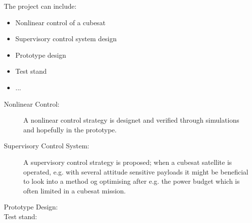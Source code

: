 The project can include:
\begin{itemize}\tightlist
  \item Nonlinear control of a cubesat
  \item Supervisory control system design
  \item Prototype design
  \item Test stand
  \item ...
\end{itemize}

\begin{description}
  \item[Nonlinear Control:] A nonlinear control strategy is designet and verified through simulations and hopefully in the prototype.
  \item[Supervisory Control System:] A supervisory control strategy is proposed; when a cubesat satellite is operated, e.g. with several attitude sensitive payloads it might be beneficial to look into a method og optimising after e.g. the power budget which is often limited in a cubesat mission.
  \item[Prototype Design:] 
  \item[Test stand:] 
\end{description}
